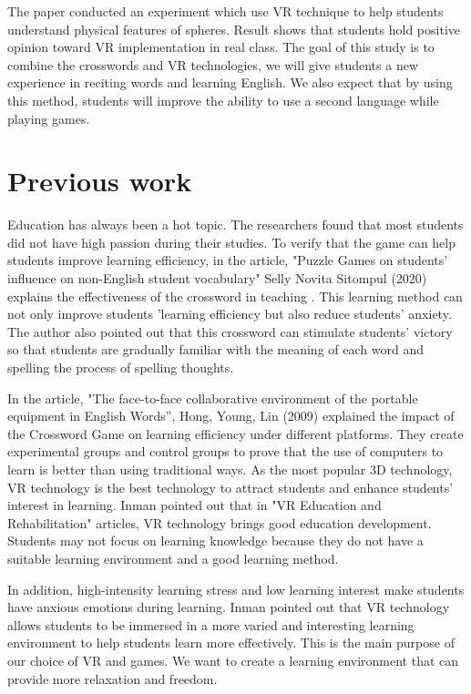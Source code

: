 \documentclass{vgtc}                          %
\begin{document}
The paper conducted an experiment which use VR technique to help students understand physical features of spheres. Result shows that students hold positive opinion toward VR implementation in real class. The goal of this study is to combine the crosswords and VR technologies, we will give students a new experience in reciting words and learning English. We also expect that by using this method, students will improve the ability to use a second language while playing games.

\section{Previous work}

Education has always been a hot topic. The researchers found that most students did not have high passion during their studies. To verify that the game can help students improve learning efficiency, in the article, "Puzzle Games on students' influence on non-English student vocabulary" Selly Novita Sitompul (2020) explains the effectiveness of the crossword in teaching \cite{sitompul2020effect}. This learning method can not only improve students 'learning efficiency but also reduce students' anxiety. The author also pointed out that this crossword can stimulate students' victory so that students are gradually familiar with the meaning of each word and spelling the process of spelling thoughts. 

In the article, "The face-to-face collaborative environment of the portable equipment in English Words”, Hong, Young, Lin (2009) explained the impact of the Crossword Game on learning efficiency under different platforms\cite{hung2009constructing}. They create experimental groups and control groups to prove that the use of computers to learn is better than using traditional ways.
As the most popular 3D technology, VR technology is the best technology to attract students and enhance students' interest in learning. Inman pointed out that in "VR Education and Rehabilitation" articles, VR technology brings good education development. Students may not focus on learning knowledge because they do not have a suitable learning environment and a good learning method\cite{inman1997vr}. 

In addition, high-intensity learning stress and low learning interest make students have anxious emotions during learning. Inman pointed out that VR technology allows students to be immersed in a more varied and interesting learning environment to help students learn more effectively\cite{alfadil2020effectiveness}. This is the main purpose of our choice of VR and games. We want to create a learning environment that can provide more relaxation and freedom. 
\end{document}
